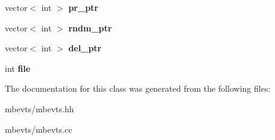 \begin{DoxyCompactItemize}
vector$<$ int $>$ {\bfseries pr\+\_\+ptr}
\item 
\mbox{\label{classmbevts_aea8371f283b731fdba6e3af0e9a74852}} 
vector$<$ int $>$ {\bfseries rndm\+\_\+ptr}
\item 
\mbox{\label{classmbevts_ac5f29344cdf6ba222e9ccd437542ca16}} 
vector$<$ int $>$ {\bfseries del\+\_\+ptr}
\item 
\mbox{\label{classmbevts_ab0eb943464d109e2218004991e175938}} 
int {\bfseries file}
\end{DoxyCompactItemize}


The documentation for this class was generated from the following files\+:\begin{DoxyCompactItemize}
\item 
mbevts/mbevts.\+hh\item 
mbevts/mbevts.\+cc\end{DoxyCompactItemize}
